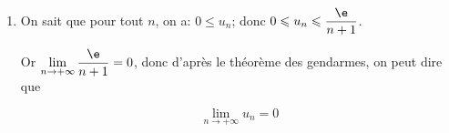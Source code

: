 \begin{enumerate}
\begin{enumerate}
$\begin{aligned}[t]
0 \leqslant  x \leqslant 1 
 &\implies  1-x  \leqslant 1 
\implies   \e^{1-x} \leqslant \e \text{~~~~(croissance de la fonction exponentielle)}\\
 &\implies   x^n \e^{1-x} \leqslant x^n\times \e ~~~~(x^n\geqslant 0)\\
 &\implies   \ds\int_{0}^{1} x^n \e^{1-x} \d x \leqslant \ds\int_{0}^{1}   x^n\times \e \d x \text{~~~~(craoissance de l'intégration)}\\
 &\implies   \ds\int_{0}^{1} x^n \e^{1-x} \d x \leqslant \e \ds\int_{0}^{1} x^n \d x
\implies   u_n \leqslant \e \left [ \dfrac{x^{n+1}}{n+1} \right ]_{0}^{1}\\
 & \implies   u_n \leqslant \dfrac{\e}{n+1} \\
\end{aligned}$

\item On sait que pour tout $n$, on a: $0\leqslant u_n$; donc $0\leqslant u_n \leqslant \dfrac{\e}{n+1}$.

Or  $\displaystyle\lim_{n \to + \infty} \dfrac{\e}{n+1} = 0$, donc d'après le théorème des gendarmes, on peut dire que  

\[\boxed{\displaystyle\lim_{n \to + \infty} u_n = 0}\]
	\end{enumerate}
\end{enumerate}


\bigskip
